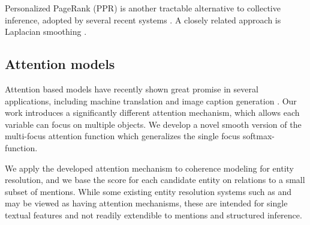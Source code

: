 Personalized PageRank (PPR) \cite{jeh2003scaling} is another tractable alternative to collective inference, adopted by several recent systems \cite{Han2011,He13,Alhelbawy14,Pershina2015}. A closely related approach is Laplacian smoothing \cite{Huang2014}. 


\subsection{Attention models}
Attention based models have recently shown great promise in several applications, including machine translation \cite{bahdanau2014neural} and image caption generation \cite{xu2015show}.  
Our work introduces a significantly different attention mechanism, which allows each variable can focus on multiple objects. 
We develop a novel smooth version of the multi-focus attention function which generalizes the single focus softmax-function.

We apply the developed attention mechanism to coherence modeling for entity resolution, and we base the score for each candidate entity on relations to a small subset of mentions. While some existing entity resolution systems such as  and  may be viewed as having attention mechanisms, these are intended for single textual features and not readily extendible to mentions and structured inference.


